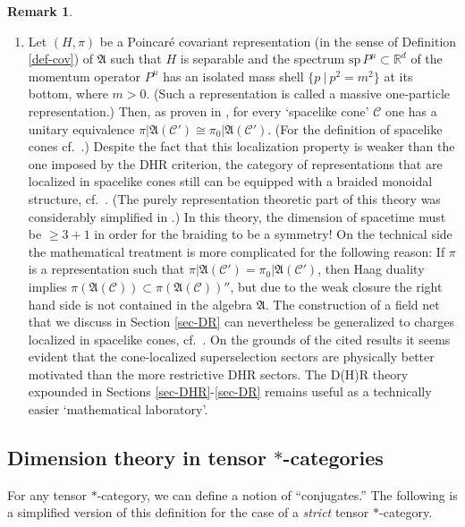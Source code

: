 \documentclass[12pt]{article}
\newcommand{\alg}[1]{\mathfrak{#1}}
\theoremstyle{definition}
\theoremstyle{definition}
\newtheorem{note}[thm]{Remark}
\theoremstyle{remark}
\def\2#1{{\mathcal #1}}
\def\7#1{{\mathbb #1}}
\begin{document}
\begin{note}
\begin{enumerate}
\item Let $(H,\pi)$ be a Poincar\'e covariant representation (in the
sense of Definition \ref{def-cov}) of $\alg{A}$ such that $H$ is
separable and the spectrum $\mathrm{sp}\,P^\mu\subset\7R^d$ of the
momentum operator $P^\mu$ has an isolated mass shell $\{p \ | \
p^2=m^2\}$ at its bottom, where $m>0$. (Such a representation is
called a massive one-particle representation.) Then, as proven in
\cite{buch-fred}, for every `spacelike cone' $\2C$ one has a unitary
equivalence $\pi|\alg{A}(\2C')\cong\pi_0|\alg{A}(\2C')$. (For the
definition of spacelike cones cf.\ \cite{buch-fred}.) Despite the fact
that this localization property is weaker than the one imposed by the
DHR criterion, the category of representations that are localized in
spacelike cones still can be equipped with a braided monoidal
structure, cf.\ \cite{buch-fred}. (The purely representation theoretic
part of this theory was considerably simplified in \cite[Section
4]{dr2}.) In this theory, the dimension of spacetime must be $\ge 3+1$
in order for the braiding to be a symmetry! On the technical side the
mathematical treatment is more complicated for the following reason:
If $\pi$ is a representation such that
$\pi|\alg{A}(\2C')=\pi_0|\alg{A}(\2C')$, then Haag duality implies
$\pi(\alg{A}(\2C))\subset\pi(\alg{A}(\2C))''$, but due to the weak
closure the right hand side is not contained in the algebra $\alg{A}$.
The construction of a field net that we discuss in Section
\ref{sec-DR} can nevertheless be generalized to charges localized in
spacelike cones, cf.\ \cite[Section 5]{dr2}. On the grounds of the
cited results it seems evident that the cone-localized superselection
sectors are physically better motivated than the more restrictive DHR
sectors. The D(H)R theory expounded in Sections
\ref{sec-DHR}-\ref{sec-DR} remains useful as a technically easier
`mathematical laboratory'.
\end{enumerate}
\end{note}


\subsection{Dimension theory in tensor
  $*$-categories} \label{dimension}

For any tensor $*$-category, we can define a notion of
``conjugates.''  The following is a simplified version
of this definition for the case of a \emph{strict}
tensor $*$-category.  
\end{document}
